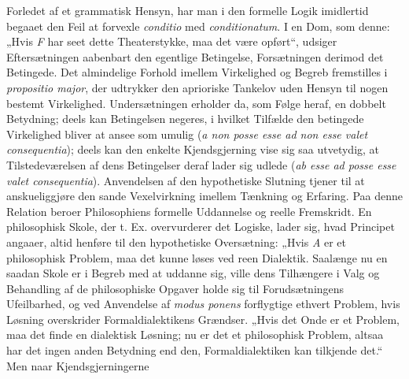 \documentclass[12pt]{book}
\newcommand{\opage}[1]{\marginnote{\footnotesize\textit{[#1]}}}
\begin{document}
Forledet af et grammatisk Hensyn, har man i den formelle Logik imidlertid begaaet
den Feil at forvexle \textit{conditio} med \textit{conditionatum}. I en Dom, som
denne: „Hvis \textit{F} har seet dette Theaterstykke, maa det være opført“, udsiger
Eftersætningen aabenbart den egentlige Betingelse, Forsætningen derimod det
Betingede. Det almindelige Forhold imellem Virkelighed og Begreb fremstilles i
\textit{propositio major}, der udtrykker den aprioriske Tankelov uden Hensyn til
nogen bestemt Virkelighed. Undersætningen erholder da, som Følge heraf, en dobbelt
Betydning; deels kan Betingelsen negeres, i hvilket Tilfælde den betingede
Virkelighed bliver at ansee som umulig (\textit{a non posse esse ad non esse valet
consequentia}); deels kan den enkelte Kjendsgjerning vise sig saa utvetydig, at
Tilstedeværelsen af dens Betingelser deraf lader sig udlede (\textit{ab esse ad
posse esse valet consequentia}). Anvendelsen af den hypothetiske Slutning tjener til
at anskueliggjøre den sande Vexelvirkning imellem Tænkning og Erfaring. Paa denne
Relation beroer Philosophiens formelle Uddannelse og reelle Fremskridt. En
philosophisk Skole, der t. Ex. overvurderer det Logiske, lader sig, hvad Principet
angaaer, altid henføre til den hypothetiske Oversætning: „Hvis \textit{A} er et%
\opage{86}%
philosophisk Problem, maa det kunne løses ved reen Dialektik. Saalænge nu en saadan
Skole er i Begreb med at uddanne sig, ville dens Tilhængere i Valg og Behandling af
de philosophiske Opgaver holde sig til Forudsætningens Ufeilbarhed, og ved
Anvendelse af \textit{modus ponens} forflygtige ethvert Problem, hvis Løsning
overskrider Formaldialektikens Grændser. „Hvis det Onde er et Problem, maa det finde
en dialektisk Løsning; nu er det et philosophisk Problem, altsaa har det ingen anden
Betydning end den, Formaldialektiken kan tilkjende det.“ Men naar Kjendsgjerningerne
\end{document}
